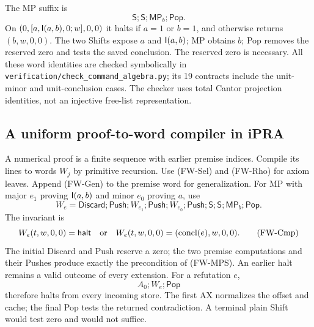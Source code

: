 The MP suffix is
\[
 \mathsf S;\mathsf S;\mathsf{MP}_b;\mathsf{Pop}.          \tag{FW-MPS}
\]
On $(0,[a,\mathsf I(a,b),0;w],0,0)$ it halts if $a=1$ or $b=1$,
and otherwise returns $(b,w,0,0)$.  The two Shifts expose $a$ and
$\mathsf I(a,b)$; MP obtains $b$; Pop removes the reserved zero and tests
the saved conclusion.  The reserved zero is necessary.  All these
word identities are checked symbolically in
\nolinkurl{verification/check_command_algebra.py}; its 19 contracts
include the unit-minor and unit-conclusion cases.  The checker uses total
Cantor projection identities, not an injective free-list representation.

\subsection{A uniform proof-to-word compiler in iPRA}

A numerical proof is a finite sequence with earlier premise indices.
Compile its lines to words $W_j$ by primitive recursion.  Use (FW-Sel)
and (FW-Rho) for axiom leaves.  Append (FW-Gen) to the premise word for
generalization.  For MP with major $e_1$ proving $\mathsf I(a,b)$ and minor
$e_0$ proving $a$, use
\[
 W_e=\mathsf{Discard};\mathsf{Push};W_{e_1};\mathsf{Push};
 W_{e_0};\mathsf{Push};\mathsf S;\mathsf S;
 \mathsf{MP}_b;\mathsf{Pop}.                             \tag{FW-Compile}
\]
The invariant is
\[
 W_e(t,w,0,0)=\mathsf{halt}\quad\hbox{or}\quad
 W_e(t,w,0,0)=(\operatorname{concl}(e),w,0,0).            \tag{FW-Cmp}
\]
The initial Discard and Push reserve a zero; the two premise computations
and their Pushes produce exactly the precondition of (FW-MPS).  An earlier
halt remains a valid outcome of every extension.  For a refutation $e$,
\[
                          A_0;W_e;\mathsf{Pop}             \tag{FW-Ref}
\]
therefore halts from every incoming store.  The first AX normalizes the
offset and cache; the final Pop tests the returned contradiction.  A
terminal plain Shift would test zero and would not suffice.

